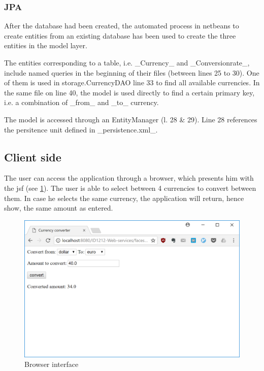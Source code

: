 \documentclass[a4paper]{scrartcl}
\begin{document}
\subsubsection{JPA}
After the database had been created, the automated process in netbeans to create entities from an existing database has been used to create the three entities in the model layer.

The entities corresponding to a table, i.e. _Currency_ and _Conversionrate_, include named queries in the beginning of their files (between lines 25 to 30). 
One of them is used in storage.CurrencyDAO line 33 to find all available currencies.
In the same file on line 40, the model is used directly to find a certain primary key, i.e. a combination of _from_ and _to_ currency.

The model is accessed through an EntityManager (l. 28 \& 29). Line 28 references the persitence unit defined in _persistence.xml_.



\subsection{Client side}
The user can access the application through a browser, which presents him with the jsf (see \ref{fig:ui}).
The user is able to select between 4 currencies to convert between them.
In case he selects the same currency, the application will return, hence show, the same amount as entered.

\begin{figure}[h!]
  \begin{center}
    \includegraphics[scale=0.5]{ui.png}
    \caption{Browser interface}
    \label{fig:ui}
  \end{center}
\end{figure}
\end{document}
